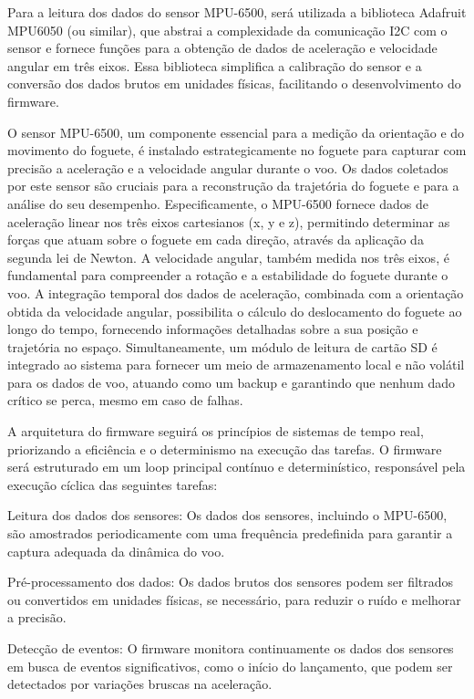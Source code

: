Para a leitura dos dados do sensor MPU-6500, será utilizada a biblioteca Adafruit MPU6050 (ou similar), que abstrai a complexidade da comunicação I2C com o sensor e fornece funções para a obtenção de dados de aceleração e velocidade angular em três eixos. Essa biblioteca simplifica a calibração do sensor e a conversão dos dados brutos em unidades físicas, facilitando o desenvolvimento do firmware.

O sensor MPU-6500, um componente essencial para a medição da orientação e do movimento do foguete, é instalado estrategicamente no foguete para capturar com precisão a aceleração e a velocidade angular durante o voo. Os dados coletados por este sensor são cruciais para a reconstrução da trajetória do foguete e para a análise do seu desempenho. Especificamente, o MPU-6500 fornece dados de aceleração linear nos três eixos cartesianos (x, y e z), permitindo determinar as forças que atuam sobre o foguete em cada direção, através da aplicação da segunda lei de Newton. A velocidade angular, também medida nos três eixos, é fundamental para compreender a rotação e a estabilidade do foguete durante o voo. A integração temporal dos dados de aceleração, combinada com a orientação obtida da velocidade angular, possibilita o cálculo do deslocamento do foguete ao longo do tempo, fornecendo informações detalhadas sobre a sua posição e trajetória no espaço. Simultaneamente, um módulo de leitura de cartão SD é integrado ao sistema para fornecer um meio de armazenamento local e não volátil para os dados de voo, atuando como um backup e garantindo que nenhum dado crítico se perca, mesmo em caso de falhas.

A arquitetura do firmware seguirá os princípios de sistemas de tempo real, priorizando a eficiência e o determinismo na execução das tarefas. O firmware será estruturado em um loop principal contínuo e determinístico, responsável pela execução cíclica das seguintes tarefas:

Leitura dos dados dos sensores: Os dados dos sensores, incluindo o MPU-6500, são amostrados periodicamente com uma frequência predefinida para garantir a captura adequada da dinâmica do voo.

Pré-processamento dos dados: Os dados brutos dos sensores podem ser filtrados ou convertidos em unidades físicas, se necessário, para reduzir o ruído e melhorar a precisão.

Detecção de eventos: O firmware monitora continuamente os dados dos sensores em busca de eventos significativos, como o início do lançamento, que podem ser detectados por variações bruscas na aceleração.

